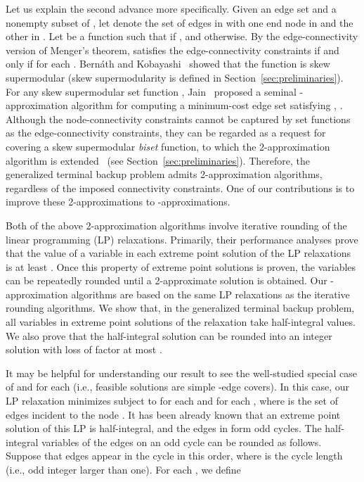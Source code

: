 \documentclass{article}
\begin{document}
Let us explain the second advance more specifically.
Given an edge set  and a nonempty subset  of , 
let  denote the set of edges in  with one end node
in  and the other in . 
Let  be a function such that 
 if , and  otherwise. 
By the edge-connectivity version of 
Menger's theorem,  satisfies the edge-connectivity constraints if and only if
 for each . 
Bern{\'a}th and
Kobayashi~\cite{Bernath2014} showed that the function  is skew supermodular 
(skew supermodularity is defined in Section~\ref{sec:preliminaries}). 
For any skew supermodular set function ,
Jain~\cite{Jain01} proposed a seminal -approximation algorithm for computing
a minimum-cost edge set 
satisfying , .
Although the node-connectivity constraints cannot be captured by set functions 
as the edge-connectivity constraints,
they can be regarded as a request for covering a skew supermodular
\emph{biset} function, to which the 2-approximation algorithm is extended~\cite{FleischerJW06} 
(see Section~\ref{sec:preliminaries}). Therefore, the
generalized terminal backup problem admits 2-approximation algorithms, 
regardless of the imposed connectivity constraints. 
One of our contributions is to improve these 2-approximations to
-approximations.


Both of the above 2-approximation algorithms involve 
iterative rounding of the linear programming (LP) relaxations.
Primarily, their performance analyses
prove that the value of a variable in each extreme point solution of the LP relaxations
is at least . Once this property of extreme point solutions is proven,
the variables can be repeatedly rounded until 
a 2-approximate solution is obtained. 
Our -approximation algorithms are based on the same LP 
relaxations as the iterative rounding algorithms. We
show that, in the generalized terminal backup problem,
all variables in extreme point solutions of the relaxation take 
half-integral values.
We also prove that the half-integral solution can be rounded into an integer solution
with loss of factor at most .

It may be helpful for understanding our result to see the well-studied special case of  
and  for each  (i.e., feasible solutions are simple -edge covers).
In this case, our LP relaxation minimizes  subject to 
 for each 
and  for each , where  is the set of edges incident to the node .
It has been already known that an extreme point solution of this LP 
is half-integral, and the edges in  form odd cycles.
The half-integral variables of the edges on an odd cycle
can be rounded as follows. Suppose that edges  
appear in the cycle in this order, where  is the cycle length (i.e., odd integer larger than one).
For each ,
we define 
\end{document}
